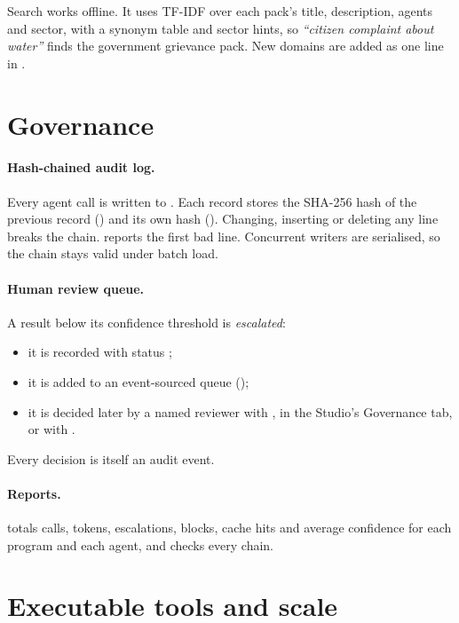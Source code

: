 Search works offline. It uses TF-IDF over each pack's title, description, agents and sector, with a synonym table and sector hints, so \emph{``citizen complaint about water''} finds the government grievance pack. New domains are added as one line in .

\section{Governance}

\paragraph{Hash-chained audit log.} Every agent call is written to . Each record stores the SHA-256 hash of the previous record () and its own hash (). Changing, inserting or deleting any line breaks the chain.  reports the first bad line. Concurrent writers are serialised, so the chain stays valid under batch load.

\paragraph{Human review queue.} A result below its confidence threshold is \emph{escalated}:
\begin{itemize}
\item it is recorded with status ;
\item it is added to an event-sourced queue ();
\item it is decided later by a named reviewer with , in the Studio's Governance tab, or with .
\end{itemize}
Every decision is itself an audit event.

\paragraph{Reports.}  totals calls, tokens, escalations, blocks, cache hits and average confidence for each program and each agent, and checks every chain.

\section{Executable tools and scale}


